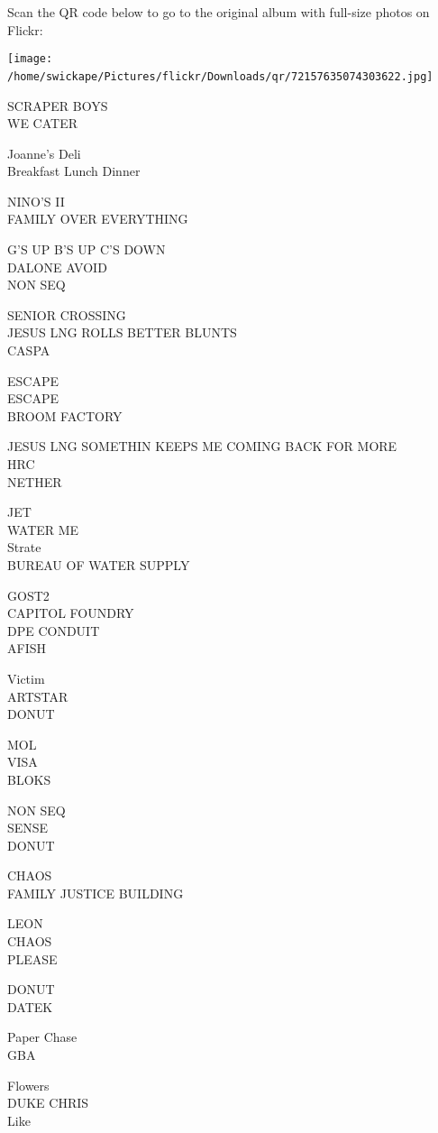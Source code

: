 \documentclass[10pt,letterpaper]{article}
\begin{document}
Scan the QR code below to go to the original album with full-size photos on Flickr:

\texttt{[image: /home/swickape/Pictures/flickr/Downloads/qr/72157635074303622.jpg]}
\

SCRAPER BOYS\\
WE CATER

Joanne's Deli\\
Breakfast Lunch Dinner

NINO'S II\\
FAMILY OVER EVERYTHING

G'S UP B'S UP C'S DOWN\\
DALONE AVOID\\
NON SEQ

SENIOR CROSSING\\
JESUS LNG ROLLS BETTER BLUNTS\\
CASPA

ESCAPE\\
ESCAPE\\
BROOM FACTORY

JESUS LNG SOMETHIN KEEPS ME COMING BACK FOR MORE\\
HRC\\
NETHER

JET\\
WATER ME\\
Strate\\
BUREAU OF WATER SUPPLY

GOST2\\
CAPITOL FOUNDRY\\
DPE CONDUIT\\
AFISH

Victim\\
ARTSTAR\\
DONUT

MOL\\
VISA\\
BLOKS

NON SEQ\\
SENSE\\
DONUT

CHAOS\\
FAMILY JUSTICE BUILDING

LEON\\
CHAOS\\
PLEASE

DONUT\\
DATEK

Paper Chase\\
GBA

Flowers\\
DUKE CHRIS\\
Like
\end{document}
